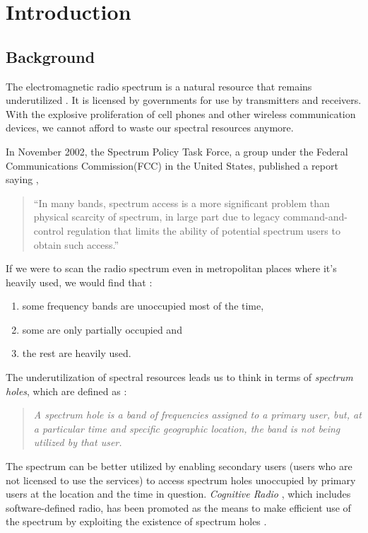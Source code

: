 \chapter{Introduction}
\section{Background}
The electromagnetic radio spectrum is a natural resource that remains 
underutilized \cite{haykin05}.
It is licensed by governments for use by transmitters and receivers.
With the explosive proliferation of cell phones and other wireless 
communication devices,
we cannot afford to waste our spectral resources anymore.

In November 2002, the Spectrum Policy Task Force, a group under the Federal
Communications Commission(FCC) 
in the United States, published a report saying \cite{repFCC}, 
\begin{quote}
``In many bands, spectrum access is a more significant problem than physical 
scarcity of spectrum,
in large part due to legacy command-and-control regulation that limits the 
ability of potential spectrum users to obtain such access.''
\end{quote}

If we were to scan the radio spectrum even in metropolitan places where it's
heavily used, 
we would find that \cite{staple04}:
\begin{enumerate}
	\item some frequency bands are unoccupied most of the time,
	\item some are only partially occupied and
	\item the rest are heavily used.
\end{enumerate}

The underutilization of spectral resources leads us to think in terms of 
\emph{spectrum holes}, which are defined as \cite{kolodzy01}:
\begin{quote}
\emph{A spectrum hole is a band of frequencies assigned to a primary user, 
but, at a particular time and specific geographic location, the band is not 
being utilized by that user.
}
\end{quote}

The spectrum can be better utilized by enabling secondary users (users who are
not licensed to use the services) to access spectrum holes unoccupied by 
primary users at the location and the time in question. \emph{Cognitive Radio}
, which includes software-defined radio, has been promoted as the means to 
make efficient use of the spectrum by exploiting the existence of spectrum 
holes \cite{haykin05}\cite{mitola99}\cite{mitola00}.

